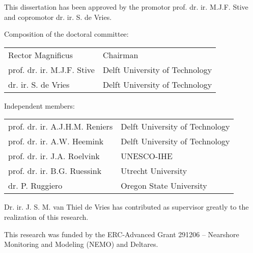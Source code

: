 \thispagestyle{empty}

\hfill

\vfill

\noindent This dissertation has been approved by the promotor
prof. dr. ir. M.J.F. Stive and copromotor dr. ir. S. de Vries.

\bigskip

\noindent Composition of the doctoral committee:

\begin{table}[h]
  \begin{tabular}{ll}
    Rector Magnificus              & Chairman \\
    prof. dr. ir. M.J.F. Stive     & Delft University of Technology \\
    dr. ir. S. de Vries            & Delft University of Technology \\
  \end{tabular}
\end{table}

\noindent Independent members:

\begin{table}[h]
  \begin{tabular}{ll}
    prof. dr. ir. A.J.H.M. Reniers & Delft University of Technology \\
    prof. dr. ir. A.W. Heemink     & Delft University of Technology \\
    prof. dr. ir. J.A. Roelvink    & UNESCO-IHE \\
    prof. dr. ir. B.G. Ruessink    & Utrecht University \\
    dr. P. Ruggiero                & Oregon State University \\
  \end{tabular}
\end{table}

\vfill

\noindent Dr. ir. J. S. M. van Thiel de Vries has contributed as
supervisor greatly to the realization of this research.

\bigskip

\noindent This research was funded by the ERC-Advanced Grant 291206 --
Nearshore Monitoring and Modeling (NEMO) and Deltares.

